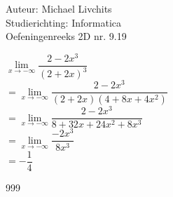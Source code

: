 \documentclass[a4paper]{article}
\begin{document}
  
\noindent \large Auteur: Michael Livchits \\
\noindent \large Studierichting: Informatica\\
\noindent \large Oefeningenreeks 2D nr. 9.19\\

\medskip

\normalsize

$ \lim\limits_{x\rightarrow -\infty} \dfrac{2-2x^3}{(2+2x)^3}$\\

$ = \lim\limits_{x\rightarrow -\infty} \dfrac{2-2x^3}{(2+2x)(4+8x+4x^2)}$\\

$ = \lim\limits_{x\rightarrow -\infty} \dfrac{2-2x^3}{8+32x+24x^2+8x^3}$\\

$ = \lim\limits_{x\rightarrow -\infty} \dfrac{-2x^3}{8x^3}$\\

$ = -\dfrac{1}{4}$\\

\begin{thebibliography}{999}
\end{thebibliography}
\end{document}
